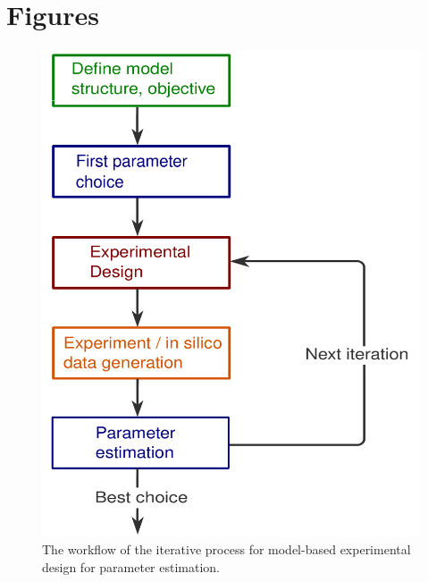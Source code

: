 \documentclass[graybox]{svmult}
\begin{document}
\section*{Figures}
\begin{figure}[H]
    \centering
    \includegraphics[scale=0.3]{Figures/scheme.pdf}
    \caption{{\footnotesize The workflow of the iterative process for model-based experimental design for parameter estimation.}}
    \label{fig:expdesign_scheme}
\end{figure}
%
%
\end{document}
